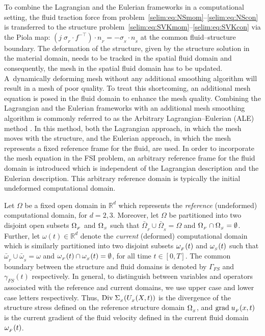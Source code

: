 To combine the Lagrangian and the Eulerian frameworks
in a computational setting, the fluid traction force from
problem~\eqref{selim:eq:NSmom}--\eqref{selim:eq:NScon} is transferred to
the structure problem~\eqref{selim:eq:SVKmom}--\eqref{selim:eq:SVKcon}
via the Piola map: $(j\;\sigma_{_{F}}\cdot f^{-\top})\cdot n_{_{F}} = -
\sigma_{_{S}}\cdot n_{_{S}}$ at the common fluid--structure boundary.
The deformation of the structure, given by the structure solution
in the material domain, needs to be tracked in the spatial fluid
domain and consequently, the mesh in the spatial fluid domain has
to be updated. A~dynamically deforming mesh without any additional
smoothing algorithm will result in a mesh of poor quality. To treat
this shortcoming, an additional mesh equation is posed in the fluid
domain to enhance the mesh quality. Combining the Lagrangian and the
Eulerian frameworks with an additional mesh smoothing algorithm is
commonly referred to as the Arbitrary Lagrangian--Eulerian (ALE) method
\citep{DoneaGiulianiHalleux1982,DoneaHuertaPonthotEtAl2004}. In this
method, both the Lagrangian approach, in which the mesh moves with the
structure, and the Eulerian approach, in which the mesh represents a
fixed reference frame for the fluid, are used. In order to incorporate
the mesh equation in the FSI problem, an arbitrary reference frame for
the fluid domain is introduced which is independent of the Lagrangian
description and the Eulerian description. This arbitrary reference domain
is typically the initial undeformed computational domain.

Let $\Omega$ be a fixed open domain in $\mathbb{R}^d$ which represents
the \emph{reference} (undeformed) computational domain, for
$d=2,3$. Moreover, let $\Omega$ be partitioned into two disjoint open
subsets $\Omega_{_{F}}$ and $\Omega_{_{S}}$ such that
$\bar{\Omega}_{_{F}}\cup\bar{\Omega}_{_{S}} = \Omega$ and
$\Omega_{_{F}}\cap\Omega_{_{S}}=\emptyset$. Further, let $\omega(t)\in\mathbb{R}^d$ denote
the \emph{current} (deformed) computational domain which is similarly
partitioned into two disjoint subsets $\omega_{_{F}}(t)$ and $\omega_{_{S}}(t)$ such that
$\bar{\omega}_{_{F}}\cup\bar{\omega}_{_{S}} = \omega$ and
$\omega_{_{F}}(t)\cap\omega_{_{S}}(t)=\emptyset$, for all time $t\in[0,T]$. The common
boundary between the structure and fluid domains is denoted by
$\Gamma_{FS}$ and $\gamma_{FS}(t)$ respectively. In general, to
distinguish between variables and operators associated with the
reference and current domains, we use upper case and lower case
letters respectively. Thus, $\textrm{Div}\;\Sigma_{_{S}}(U_{_{S}}(X,t))$ is the divergence
of the structure stress defined on the reference structure domain
$\Omega_{_{S}}$, and $\textrm{grad}\;u_{_{F}}(x,t)$ is the current gradient of the fluid
velocity defined in the current fluid domain $\omega_{_{F}}(t)$.

